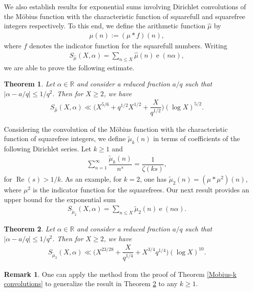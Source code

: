 \documentclass[11pt]{amsart}
\numberwithin{equation}{section}
\numberwithin{figure}{section}
\newtheorem{theorem}{Theorem}[section]
\theoremstyle{definition}
\newtheorem{remark}{Remark}[section]
\newcommand{\e}{\operatorname{e}}
\begin{document}
We also establish results for exponential sums involving Dirichlet convolutions of the M\"{o}bius function with the characteristic function of squarefull and squarefree integers respectively. To this end, we define the arithmetic function $\hat{\mu}$ by
\begin{align*}
    \hat{\mu}(n) := (\mu*f)(n),
\end{align*}
where $f$ denotes the indicator function for the squarefull numbers. Writing 
\begin{align*}
    S_{\hat{\mu}}(X, \alpha) =\sum_{n\leqslant X }\hat{\mu}(n)\e(n\alpha), 
\end{align*}
we are able to prove the following estimate.
\begin{theorem}\label{theorem 2}
Let $\alpha\in \mathbb{R}$ and consider a reduced fraction $a/q$ such that $|\alpha-a/q|\leqslant1/q^2$. Then for $X \geqslant 2$, we have
\begin{align*}
    S_{\hat{\mu}}(X, \alpha) \ll \bigg(X^{5/6} + q^{1/2}X^{1/2} + \dfrac{X}{q^{1/2}}\bigg)(\log X)^{5/2}.
\end{align*}
\end{theorem}

Considering the convolution of the M\"{o}bius function with the characteristic function of squarefree integers, we define $\tilde{\mu}_k(n)$ in terms of coefficients of the following Dirichlet series. Let $k \geqslant 1$ and
\begin{align*}
    \sum_{n=1}^\infty\dfrac{\tilde{\mu}_k(n)}{n^s}=\dfrac{1}{\zeta(ks)},
\end{align*}
for $\operatorname{Re}(s) > 1/k$. As an example, for $k=2$, one has $\tilde{\mu}_2(n) = (\mu*\mu^2)(n)$, where $\mu^2$ is the indicator function for the squarefrees. Our next result provides an upper bound for the exponential sum
\begin{align*}
 S_{\tilde{\mu}_2}(X, \alpha) = \sum_{n\leqslant X }\tilde{\mu}_2(n)\e(n\alpha).
\end{align*}
\begin{theorem}\label{theorem 3}
Let $\alpha\in \mathbb{R}$ and consider a reduced fraction $a/q$ such that $|\alpha-a/q|\leqslant1/q^2$. Then for $X \geqslant 2$, we have
\begin{align*}
S_{\tilde{\mu}_2}(X, \alpha)\ll \bigg(X^{23/28} + \dfrac{X}{q^{1/4}} + X^{3/4}q^{1/4}\bigg)(\log X)^{10}.
\end{align*}
\end{theorem}
\begin{remark}
One can apply the method from the proof of Theorem \ref{Mobius-k convolutions} to generalize the result in Theorem \ref{theorem 3} to any $k \geqslant 1$. 
\end{remark}
\end{document}

